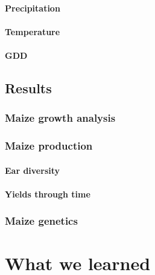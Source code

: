 \documentclass[12pt,]{krantz}
\begin{document}
\hypertarget{precipitation}{%
\subsubsection{Precipitation}\label{precipitation}}

\hypertarget{temperature}{%
\subsubsection{Temperature}\label{temperature}}

\hypertarget{gdd}{%
\subsubsection{GDD}\label{gdd}}

\hypertarget{results}{%
\section{Results}\label{results}}

\hypertarget{maize-growth-analysis}{%
\subsection*{Maize growth analysis}\label{maize-growth-analysis}}


\hypertarget{maize-production}{%
\subsection*{Maize production}\label{maize-production}}


\hypertarget{ear-diversity}{%
\subsubsection{Ear diversity}\label{ear-diversity}}

\hypertarget{yields-through-time}{%
\subsubsection{Yields through time}\label{yields-through-time}}

\hypertarget{maize-genetics}{%
\subsection*{Maize genetics}\label{maize-genetics}}


\hypertarget{what-we-learned}{%
\chapter{What we learned}\label{what-we-learned}}
\end{document}
